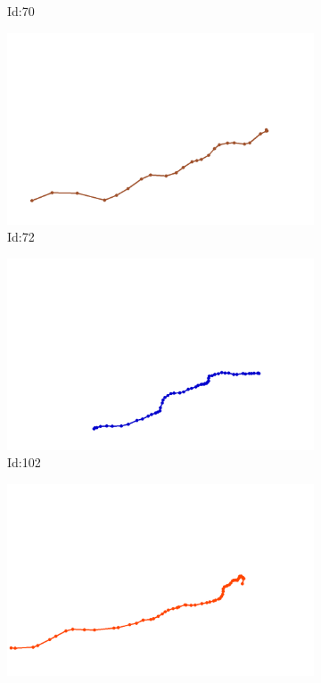 \documentclass[12pt,twoside]{report}
\begin{document}
\begin{figure}
\begin{subfigure}[b]{0.20\textwidth}
\caption{Id:70}
\end{subfigure}
\begin{subfigure}[b]{0.20\textwidth}
\centering
\includegraphics[width=\textwidth]{../trajectories/72.png}
\caption{Id:72}
\end{subfigure}
\begin{subfigure}[b]{0.20\textwidth}
\centering
\includegraphics[width=\textwidth]{../trajectories/102.png}
\caption{Id:102}
\end{subfigure}
\begin{subfigure}[b]{0.20\textwidth}
\centering
\includegraphics[width=\textwidth]{../trajectories/160.png}

\end{subfigure}
\end{figure}
\end{document}
